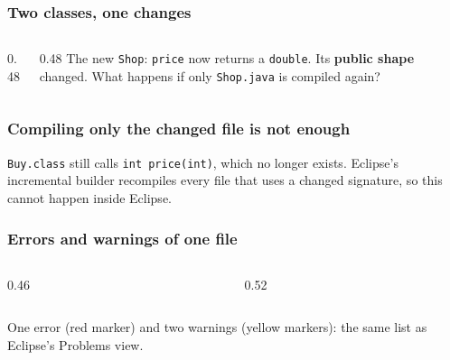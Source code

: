 \documentclass[aspectratio=169,10pt,compress]{beamer}
\begin{document}




\begin{frame}[t,fragile] \frametitle{Two classes, one changes}
  \begin{columns}[T]
    \begin{column}{0.48\textwidth}
    \end{column}
    \begin{column}{0.48\textwidth}
      \small The new \texttt{Shop}: \texttt{price} now returns a \texttt{double}. Its \textbf{public shape} changed.
      What happens if only \texttt{Shop.java} is compiled again?
    \end{column}
  \end{columns}
\end{frame}




\begin{frame}[t,fragile] \frametitle{Compiling only the changed file is not enough}

  \vspace{0.1em}
  \small
  \texttt{Buy.class} still calls \texttt{int price(int)}, which no longer exists. Eclipse's incremental builder
  recompiles every file that uses a changed signature, so this cannot happen inside Eclipse.
\end{frame}





\begin{frame}[t,fragile] \frametitle{Errors and warnings of one file}
  \begin{columns}[T]
    \begin{column}{0.46\textwidth}
    \end{column}
    \begin{column}{0.52\textwidth}
    \end{column}
  \end{columns}
  \small One error (red marker) and two warnings (yellow markers): the same list as Eclipse's Problems view.
\end{frame}
\end{document}
